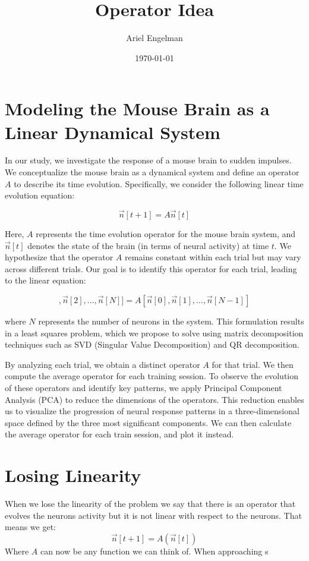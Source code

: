 \documentclass{article}
\title{Operator Idea}
\author{Ariel Engelman}
\date{\today}
\begin{document}
	
	\maketitle
	
	
	\section{Modeling the Mouse Brain as a Linear Dynamical System}
	
	In our study, we investigate the response of a mouse brain to sudden impulses. We conceptualize the mouse brain as a dynamical system and define an operator \( A \) to describe its time evolution. Specifically, we consider the following linear time evolution equation:
	
	\begin{equation}
		\vec{n}[t + 1] = A \vec{n}[t]
	\end{equation}
	
	Here, \( A \) represents the time evolution operator for the mouse brain system, and \( \vec{n}[t] \) denotes the state of the brain (in terms of neural activity) at time \( t \). We hypothesize that the operator \( A \) remains constant within each trial but may vary across different trials. Our goal is to identify this operator for each trial, leading to the linear equation:
	
	\begin{equation}
		[\vec{n}[1], \vec{n}[2], \ldots, \vec{n}[N]] = A [\vec{n}[0], \vec{n}[1], \ldots, \vec{n}[N-1]]
	\end{equation}
	
	where \( N \) represents the number of neurons in the system. This formulation results in a least squares problem, which we propose to solve using matrix decomposition techniques such as SVD (Singular Value Decomposition) and QR decomposition.
	
	By analyzing each trial, we obtain a distinct operator \( A \) for that trial. We then compute the average operator for each training session. To observe the evolution of these operators and identify key patterns, we apply Principal Component Analysis (PCA) to reduce the dimensions of the operators. This reduction enables us to visualize the progression of neural response patterns in a three-dimensional space defined by the three most significant components. We can then calculate the average operator for each train session, and plot it instead.
	
	\section{Losing Linearity}
	When we lose the linearity of the problem we say that there is an operator that evolves the neurons activity but it is not linear with respect to the neurons. That means we get:
	\begin{equation}
		\vec{n}[t + 1] = A(\vec{n}[t])
	\end{equation}
	Where \( A\) can now be any function we can think of. When approaching s
\end{document}

